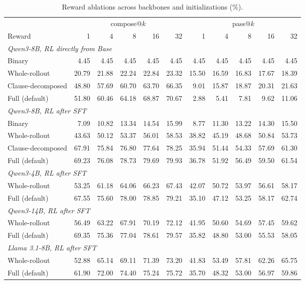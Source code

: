 \begin{table}[H]
\centering
\small
\caption{Reward ablations across backbones and initializations (\%).}
\label{tab:reward-ablation}
\begin{tabular}{lrrrrrrrrrr}
\toprule
\rowcolor{algobg}
& \multicolumn{5}{c}{compose@\(k\)} & \multicolumn{5}{c}{pass@\(k\)} \\
\headercmidrules{\cmidrule(lr){2-6}\cmidrule(lr){7-11}}
\rowcolor{algobg}
Reward & 1 & 4 & 8 & 16 & 32& 1 & 4 & 8 & 16 & 32 \\
\midrule
\multicolumn{11}{l}{\textit{Qwen3-8B, RL directly from Base}} \\
Binary & 4.45 & 4.45 & 4.45 & 4.45 & 4.45& 4.45 & 4.45 & 4.45 & 4.45 & 4.45 \\
Whole-rollout & 20.79 & 21.88 & 22.24 & 22.84 & 23.32& 15.50 & 16.59 & 16.83 & 17.67 & 18.39 \\
Clause-decomposed & 48.80 & 57.69 & 60.70 & 63.70 & 66.35& 9.01 & 15.87 & 18.87 & 20.31 & 21.63 \\
Full (default) & 51.80 & 60.46 & 64.18 & 68.87 & 70.67& 2.88 & 5.41 & 7.81 & 9.62 & 11.06 \\
\midrule
\multicolumn{11}{l}{\textit{Qwen3-8B, RL after SFT}} \\
Binary & 7.09 & 10.82 & 13.34 & 14.54 & 15.99& 8.77 & 11.30 & 13.22 & 14.30 & 15.50 \\
Whole-rollout & 43.63 & 50.12 & 53.37 & 56.01 & 58.53& 38.82 & 45.19 & 48.68 & 50.84 & 53.73 \\
Clause-decomposed & 67.91 & 75.84 & 76.80 & 77.64 & 78.25& 35.94 & 51.44 & 54.33 & 57.69 & 61.30 \\
Full (default) & 69.23 & 76.08 & 78.73 & 79.69 & 79.93& 36.78 & 51.92 & 56.49 & 59.50 & 61.54 \\
\midrule
\multicolumn{11}{l}{\textit{Qwen3-4B, RL after SFT}} \\
Whole-rollout & 53.25 & 61.18 & 64.06 & 66.23 & 67.43& 42.07 & 50.72 & 53.97 & 56.61 & 58.17 \\
Full (default) & 67.55 & 75.60 & 78.00 & 78.85 & 79.21& 35.10 & 47.12 & 53.25 & 58.17 & 62.74 \\
\midrule
\multicolumn{11}{l}{\textit{Qwen3-14B, RL after SFT}} \\
Whole-rollout & 56.49 & 63.22 & 67.91 & 70.19 & 72.12& 41.95 & 50.60 & 54.69 & 57.45 & 59.62 \\
Full (default) & 69.35 & 75.36 & 77.04 & 78.61 & 79.57& 35.82 & 48.80 & 53.00 & 55.53 & 58.05 \\
\midrule
\multicolumn{11}{l}{\textit{Llama 3.1-8B, RL after SFT}} \\
Whole-rollout & 52.88 & 65.14 & 69.11 & 71.39 & 73.20& 41.83 & 53.49 & 57.81 & 62.26 & 65.75 \\
Full (default) & 61.90 & 72.00 & 74.40 & 75.24 & 75.72& 35.70 & 48.32 & 53.00 & 56.97 & 59.86 \\
\bottomrule
\end{tabular}
\end{table}

